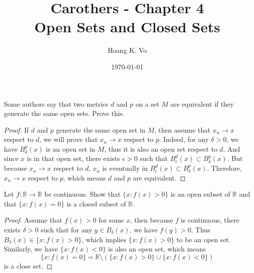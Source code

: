 \documentclass[12pt, a4paper]{article}
\title{Carothers - Chapter 4\\ Open Sets and Closed Sets}
\author{Hoang K. Vo}
\date{\today}
\theoremstyle{plain}
\newcommand{\R}{\mathbb{R}}
\begin{document}
\maketitle
\begin{exercise}{3}
Some authors say that two metrics $d$ and $p$ on a set $M$ are equivalent if they generate the same open sets. Prove this.
\end{exercise}
	\begin{proof}
	If $d$ and $p$ generate the same open set in $M$, then assume that $x_n\rightarrow x$ respect to $d$, we will prove that $x_n\rightarrow x$ respect to $p$. Indeed, for any $\delta >0$, we have $B_\delta^p(x)$ is an open set in $M$, thus it is also an open set respect to $d$. And since $x$ is in that open set, there exists $\epsilon >0$ such that $B_\epsilon^d(x)\subset B_\delta^p(x)$. But because $x_n\rightarrow x$ respect to $d$, $x_n$ is eventually in $ B_\epsilon^d(x)\subset B_\delta^p(x)$. Therefore, $x_n\rightarrow x$ respect to $p$, which means $d$ and $p$ are equivalent.
	\end{proof}

\begin{exercise}{5}
Let $f:\R\rightarrow\R$ be continuous. Show that $\{x:f(x)>0\}$ is an open subset of $\R$ and that $\{x:f(x)=0\}$ is a closed subset of $\R$.
\end{exercise}
	\begin{proof}
	Assume that $f(x)>0$ for some $x$, then because $f$ is continuous, there exists $\delta>0$ such that for any $y\in B_\delta(x)$, we have $f(y)>0$. Thus $B_\delta(x)\in \{x:f(x)>0\}$, which implies $\{x:f(x)>0\}$ to be an open set. Similarly, we have $\{x:f(x)<0\}$ is also an open set, which means
	\[
	\{x:f(x)=0\}=\R\setminus (\{x:f(x)>0\}\cup \{x:f(x)<0\})		
	\]
	is a close set.
	\end{proof}
	
\end{document}
